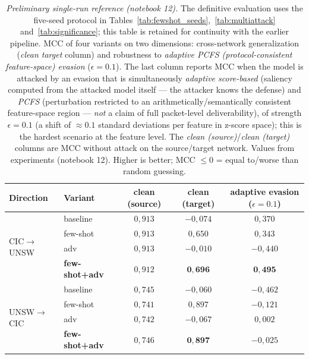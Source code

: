 \documentclass[11pt,a4paper]{article}
\begin{document}
\begin{table}[h]
\centering
\caption{\emph{Preliminary single-run reference (notebook 12).} The definitive evaluation uses the five-seed protocol in Tables~\ref{tab:fewshot_seeds},~\ref{tab:multiattack} and~\ref{tab:significance}; this table is retained for continuity with the earlier pipeline. MCC of four variants on two dimensions: cross-network generalization
(\emph{clean target} column) and robustness to \emph{adaptive PCFS
(protocol-consistent feature-space) evasion} ($\epsilon=0.1$). The last column
reports MCC when the model is attacked by an evasion that is simultaneously
\emph{adaptive score-based} (saliency computed from the attacked model itself --- the
attacker knows the defense) and \emph{PCFS} (perturbation restricted to an
arithmetically/semantically consistent feature-space region --- \emph{not} a claim
of full packet-level deliverability), of strength $\epsilon=0.1$ (a shift of
$\approx 0.1$ standard deviations per feature in z-score space); this is the hardest
scenario at the feature level. The \emph{clean (source)}/\emph{clean (target)} columns are MCC without
attack on the source/target network. Values from experiments (notebook 12). Higher
is better; MCC $\le 0$ = equal to/worse than random guessing.}
\label{tab:p2main}
\small
\begin{tabular}{llccc}
\toprule
Direction & Variant & clean (source) & clean (target) & adaptive evasion ($\epsilon=0.1$) \\
\midrule
\multirow{4}{*}{CIC$\rightarrow$UNSW}
 & baseline     & $0{,}913$ & $-0{,}074$ & $0{,}370$ \\
 & few-shot     & $0{,}913$ & $0{,}650$ & $0{,}343$ \\
 & adv          & $0{,}913$ & $-0{,}010$ & $-0{,}440$ \\
 & \textbf{few-shot+adv} & $0{,}912$ & $\mathbf{0{,}696}$ & $\mathbf{0{,}495}$ \\
\midrule
\multirow{4}{*}{UNSW$\rightarrow$CIC}
 & baseline     & $0{,}745$ & $-0{,}060$ & $-0{,}462$ \\
 & few-shot     & $0{,}741$ & $0{,}897$ & $-0{,}121$ \\
 & adv          & $0{,}742$ & $-0{,}067$ & $0{,}002$ \\
 & \textbf{few-shot+adv} & $0{,}746$ & $\mathbf{0{,}897}$ & $-0{,}025$ \\
\bottomrule
\end{tabular}
\end{table}
\end{document}
